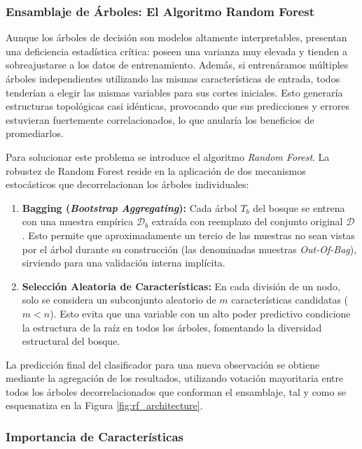 \documentclass[12pt, a4paper]{report}
\begin{document}
\subsubsection{Ensamblaje de Árboles: El Algoritmo Random Forest}

Aunque los árboles de decisión son modelos altamente interpretables, presentan una deficiencia estadística crítica: poseen una varianza muy elevada y tienden a sobreajustarse a los datos de entrenamiento. Además, si entrenáramos múltiples árboles independientes utilizando las mismas características de entrada, todos tenderían a elegir las mismas variables para sus cortes iniciales. Esto generaría estructuras topológicas casi idénticas, provocando que sus predicciones y errores estuvieran fuertemente correlacionados, lo que anularía los beneficios de promediarlos.

Para solucionar este problema se introduce el algoritmo \textit{Random Forest}. La robustez de Random Forest reside en la aplicación de dos mecanismos estocásticos que decorrelacionan los árboles individuales:

\begin{enumerate}
    \item \textbf{Bagging (\textit{Bootstrap Aggregating}):} Cada árbol $T_b$ del bosque se entrena con una muestra empírica $\mathcal{D}_b$ extraída con reemplazo del conjunto original $\mathcal{D}$ \citep{breiman2001}. Esto permite que aproximadamente un tercio de las muestras no sean vistas por el árbol durante su construcción (las denominadas muestras \textit{Out-Of-Bag}), sirviendo para una validación interna implícita.
    
    \item \textbf{Selección Aleatoria de Características:} En cada división de un nodo, solo se considera un subconjunto aleatorio de $m$ características candidatas ($m < n$). Esto evita que una variable con un alto poder predictivo condicione la estructura de la raíz en todos los árboles, fomentando la diversidad estructural del bosque.
\end{enumerate}

La predicción final del clasificador para una nueva observación se obtiene mediante la agregación de los resultados, utilizando votación mayoritaria entre todos los árboles decorrelacionados que conforman el ensamblaje, tal y como se esquematiza en la Figura \ref{fig:rf_architecture}.


\subsubsection{Importancia de Características}
\end{document}

